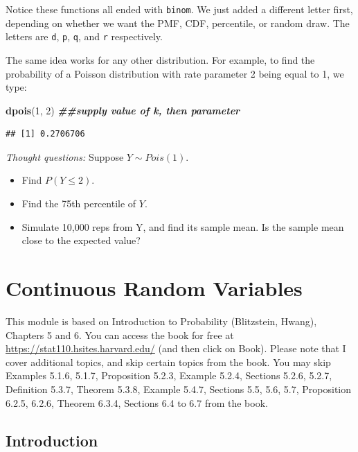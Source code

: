 \documentclass[
]{book}
\newenvironment{Shaded}{\begin{snugshade}}{\end{snugshade}}
\newcommand{\DecValTok}[1]{\textcolor[rgb]{0.00,0.00,0.81}{#1}}
\newcommand{\DocumentationTok}[1]{\textcolor[rgb]{0.56,0.35,0.01}{\textbf{\textit{#1}}}}
\newcommand{\FunctionTok}[1]{\textcolor[rgb]{0.13,0.29,0.53}{\textbf{#1}}}
\newcommand{\NormalTok}[1]{#1}
\providecommand{\tightlist}{%
  \setlength{\itemsep}{0pt}\setlength{\parskip}{0pt}}
\begin{document}
Notice these functions all ended with \texttt{binom}. We just added a different letter first, depending on whether we want the PMF, CDF, percentile, or random draw. The letters are \texttt{d}, \texttt{p}, \texttt{q}, and \texttt{r} respectively.

The same idea works for any other distribution. For example, to find the probability of a Poisson distribution with rate parameter 2 being equal to 1, we type:

\begin{Shaded}
\begin{Highlighting}[]
\FunctionTok{dpois}\NormalTok{(}\DecValTok{1}\NormalTok{, }\DecValTok{2}\NormalTok{) }\DocumentationTok{\#\#supply value of k, then parameter}
\end{Highlighting}
\end{Shaded}

\begin{verbatim}
## [1] 0.2706706
\end{verbatim}

\emph{Thought questions:} Suppose \(Y \sim Pois(1)\).

\begin{itemize}
\tightlist
\item
  Find \(P(Y \leq 2)\).
\item
  Find the 75th percentile of \(Y\).
\item
  Simulate 10,000 reps from Y, and find its sample mean. Is the sample mean close to the expected value?
\end{itemize}

\chapter{Continuous Random Variables}\label{continuous-random-variables}

This module is based on Introduction to Probability (Blitzstein, Hwang), Chapters 5 and 6. You can access the book for free at \url{https://stat110.hsites.harvard.edu/} (and then click on Book). Please note that I cover additional topics, and skip certain topics from the book. You may skip Examples 5.1.6, 5.1.7, Proposition 5.2.3, Example 5.2.4, Sections 5.2.6, 5.2.7, Definition 5.3.7, Theorem 5.3.8, Example 5.4.7, Sections 5.5, 5.6, 5.7, Proposition 6.2.5, 6.2.6, Theorem 6.3.4, Sections 6.4 to 6.7 from the book.

\section{Introduction}\label{introduction}
\end{document}

